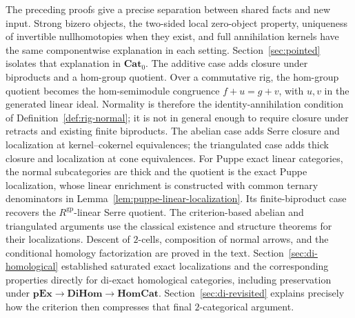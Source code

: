 \documentclass[11pt,reqno,a4paper]{amsart}
\theoremstyle{definition}
\theoremstyle{remark}
\newcommand{\0}{\mathbf{0}}
\renewcommand{\1}{\mathbf{1}}
\newcommand{\pExact}{\mathbf{pEx}}
\newcommand{\Pt}{\mathbf{Cat}_{0}}
\newcommand{\HomCat}{\mathbf{HomCat}}
\newcommand{\DiHom}{\mathbf{DiHom}}
\begin{document}
The preceding proofs give a precise separation between shared facts
and new input. Strong bizero objects, the two-sided local zero-object
property, uniqueness of invertible nullhomotopies when they exist,
and full annihilation kernels have the same componentwise explanation
in each setting. Section~\ref{sec:pointed} isolates that explanation
in $\Pt$. The additive case adds
closure under biproducts and a hom-group quotient. Over a commutative
rig, the hom-group quotient becomes the hom-semimodule congruence
$f+u=g+v$, with $u,v$ in the generated linear ideal. Normality is
therefore the identity-annihilation condition of
Definition~\ref{def:rig-normal}; it is not in general enough to
require closure under retracts and existing finite biproducts.
The abelian case adds Serre closure and localization at
kernel--cokernel equivalences; the triangulated case adds thick
closure and localization at cone equivalences. For Puppe exact
linear categories, the normal subcategories are thick and the
quotient is the exact Puppe localization, whose linear enrichment
is constructed with common ternary denominators in
Lemma~\ref{lem:puppe-linear-localization}. Its finite-biproduct
case recovers the $R^{\mathrm{gp}}$-linear Serre quotient. The criterion-based abelian and triangulated arguments use the
classical existence and structure theorems for their localizations.
Descent of $2$-cells, composition of normal arrows, and the
conditional homology factorization are proved in the text.
Section~\ref{sec:di-homological} established saturated exact
localizations and the corresponding properties directly for di-exact
homological categories, including preservation under
$\pExact\to\DiHom\to\HomCat$.
Section~\ref{sec:di-revisited} explains precisely how the criterion
then compresses that final $2$-categorical argument.
\end{document}
